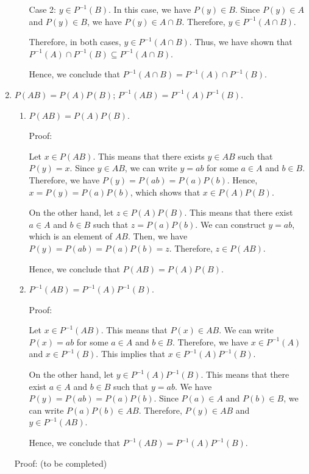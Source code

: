 \documentclass{article}
\begin{document}
\begin{enumerate}
\begin{enumerate}
    Case 2: $y \in P^{-1}(B)$. In this case, we have $P(y) \in B$. Since $P(y) \in A$ and $P(y) \in B$, we have $P(y) \in A \cap B$. Therefore, $y \in P^{-1}(A \cap B)$.
    
    Therefore, in both cases, $y \in P^{-1}(A \cap B)$. Thus, we have shown that $P^{-1}(A) \cap P^{-1}(B) \subseteq P^{-1}(A \cap B)$.
    
    Hence, we conclude that $P^{-1}(A \cap B) = P^{-1}(A) \cap P^{-1}(B)$.
    
  \end{enumerate}  
  \item $P(AB) = P(A)P(B)$; $P^{-1}(AB) = P^{-1}(A)P^{-1}(B)$.

  \begin{enumerate}
    \item $P(AB) = P(A)P(B)$.
    
    Proof:
    
    Let $x \in P(AB)$. This means that there exists $y \in AB$ such that $P(y) = x$. Since $y \in AB$, we can write $y = ab$ for some $a \in A$ and $b \in B$. Therefore, we have $P(y) = P(ab) = P(a)P(b)$. Hence, $x = P(y) = P(a)P(b)$, which shows that $x \in P(A)P(B)$.
    
    On the other hand, let $z \in P(A)P(B)$. This means that there exist $a \in A$ and $b \in B$ such that $z = P(a)P(b)$. We can construct $y = ab$, which is an element of $AB$. Then, we have $P(y) = P(ab) = P(a)P(b) = z$. Therefore, $z \in P(AB)$.
    
    Hence, we conclude that $P(AB) = P(A)P(B)$.
    
    \item $P^{-1}(AB) = P^{-1}(A)P^{-1}(B)$.
    
    Proof:
    
    Let $x \in P^{-1}(AB)$. This means that $P(x) \in AB$. We can write $P(x) = ab$ for some $a \in A$ and $b \in B$. Therefore, we have $x \in P^{-1}(A)$ and $x \in P^{-1}(B)$. This implies that $x \in P^{-1}(A)P^{-1}(B)$.
    
    On the other hand, let $y \in P^{-1}(A)P^{-1}(B)$. This means that there exist $a \in A$ and $b \in B$ such that $y = ab$. We have $P(y) = P(ab) = P(a)P(b)$. Since $P(a) \in A$ and $P(b) \in B$, we can write $P(a)P(b) \in AB$. Therefore, $P(y) \in AB$ and $y \in P^{-1}(AB)$.
    
    Hence, we conclude that $P^{-1}(AB) = P^{-1}(A)P^{-1}(B)$.
    
  \end{enumerate}
  
  Proof: (to be completed)
\end{enumerate}
\end{document}
